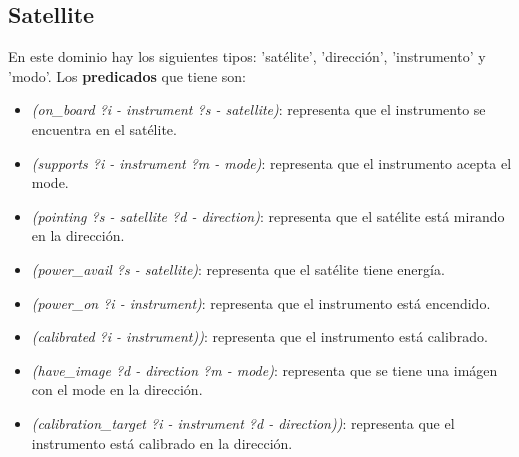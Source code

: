 \documentclass{uc3mpracticas}
\begin{document}
  \subsection{Satellite}

  En este dominio hay los siguientes tipos: 'satélite', 'dirección', 'instrumento' y 'modo'. Los \textbf{predicados} que tiene son:

  \begin{itemize}
    \item \textit{(on\_board ?i - instrument ?s - satellite)}: representa que el instrumento se encuentra en el satélite.
    \item \textit{(supports ?i - instrument ?m - mode)}: representa que el instrumento acepta el mode.
    \item \textit{(pointing ?s - satellite ?d - direction)}: representa que el satélite está mirando en la dirección.
    \item \textit{(power\_avail ?s - satellite)}: representa que el satélite tiene energía.
    \item \textit{(power\_on ?i - instrument)}: representa que el instrumento está encendido.
    \item \textit{(calibrated ?i - instrument))}: representa que el instrumento está calibrado.
    \item \textit{(have\_image ?d - direction ?m - mode)}: representa que se tiene una imágen con el mode en la dirección.
    \item \textit{(calibration\_target ?i - instrument ?d - direction))}: representa que el instrumento está calibrado en la dirección.
  \end{itemize}
\end{document}
